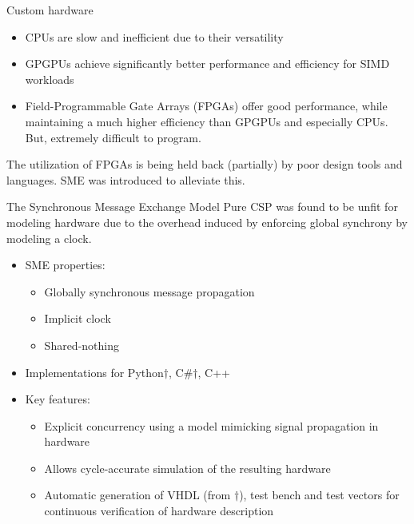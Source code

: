 \documentclass{beamer}
\begin{document}
  

  \begin{frame}{Custom hardware}
    \begin{itemize}
    \item CPUs are slow and inefficient due to their versatility
    \item GPGPUs achieve significantly better performance and efficiency for
      SIMD workloads
    \item Field-Programmable Gate Arrays (FPGAs) offer good performance, while
      maintaining a much higher efficiency than GPGPUs and especially CPUs. But,
      extremely difficult to program.
    \end{itemize}
    \pause
    \begin{block}{}
      The utilization of FPGAs is being held back (partially) by poor design
      tools and languages. SME was introduced to alleviate this.
    \end{block}
  \end{frame}
  
\begin{frame}{The Synchronous Message Exchange Model}
  Pure CSP was found to be unfit for modeling hardware due to the overhead
  induced by enforcing global synchrony by modeling a clock.

  \begin{itemize}
    \item SME properties:
  \begin{itemize}
  \item Globally synchronous message propagation
  \item Implicit clock
  \item Shared-nothing
  \end{itemize}
  \item Implementations for Python$\dagger$, C\#$\dagger$, C++
  \item Key features:
  \begin{itemize}
  \item Explicit concurrency using a model mimicking signal propagation in hardware
  \item Allows cycle-accurate simulation of the resulting hardware
  \item Automatic generation of VHDL (from $\dagger$), test bench and test vectors for
    continuous verification of hardware description
  \end{itemize}
  \end{itemize}
  
\end{frame}
\end{document}
